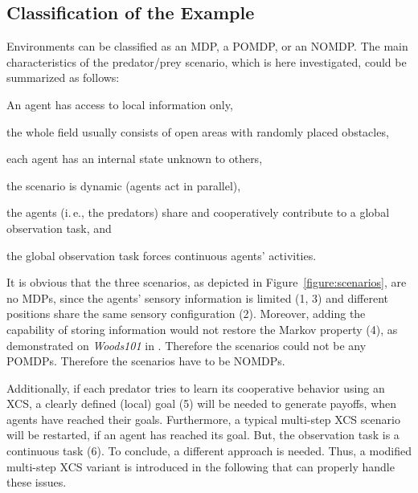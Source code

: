 \documentclass{sig-alternate}
\begin{document}
\subsection{Classification of the Example}
\label{subsection:scenario-classification}

Environments can be classified as an MDP, a POMDP, or an NOMDP. The main characteristics of the predator/prey scenario, which is here investigated, could be summarized as follows:

\begin{enumerate*}
	\item An agent has access to local information only,
	\item the whole field usually consists of open areas with randomly placed obstacles,
	\item each agent has an internal state unknown to others,
	\item the scenario is dynamic (agents act in parallel),
	\item the agents (i.\,e., the predators) share and cooperatively contribute to a glo\-bal observation task, and
	\item the global observation task forces continuous agents' activities.  
\end{enumerate*}

It is obvious that the three scenarios, as depicted in Figure~\ref{figure:scenarios}, are no MDPs, since the agents' sensory information is limited (1, 3) and different positions share the same sensory configuration (2). Moreover, adding the capability of storing information would not restore the Markov property (4), as demonstrated on \emph{Woods101} in \cite{Lan98,LW00}. Therefore the scenarios could not be any POMDPs. Therefore the scenarios have to be NOMDPs. 

Additionally, if each predator tries to learn its cooperative behavior using an XCS, a clearly defined (local) goal (5) will be needed to generate payoffs, when agents have reached their goals. Furthermore, a typical multi-step XCS scenario will be restarted, if an agent has reached its goal. But, the observation task is a continuous task (6). %
To conclude, a different approach is needed. Thus, a modified multi-step XCS variant is introduced in the following that can properly handle these issues.
\end{document}
